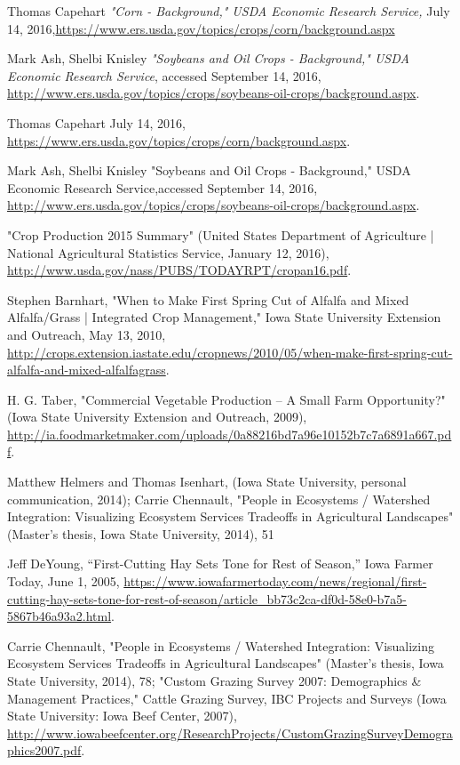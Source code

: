 \documentclass[11pt]{article}
\begin{document}
\begin{thebibliography}{1}

   Thomas Capehart {\em "Corn - Background," USDA Economic Research Service, }July 14, 2016,\url{https://www.ers.usda.gov/topics/crops/corn/background.aspx}

    Mark Ash, Shelbi Knisley {\em "Soybeans and Oil Crops - Background," USDA Economic Research Service}, accessed September 14, 2016, \url{http://www.ers.usda.gov/topics/crops/soybeans-oil-crops/background.aspx}.

   Thomas Capehart July 14, 2016, \url{https://www.ers.usda.gov/topics/crops/corn/background.aspx}.

  Mark Ash, Shelbi Knisley  "Soybeans and Oil Crops - Background," USDA Economic Research Service,accessed September 14, 2016, \url{http://www.ers.usda.gov/topics/crops/soybeans-oil-crops/background.aspx}.

  "Crop Production 2015 Summary" (United States Department of Agriculture | National Agricultural Statistics Service, January 12, 2016), \url{http://www.usda.gov/nass/PUBS/TODAYRPT/cropan16.pdf}.

  Stephen Barnhart, "When to Make First Spring Cut of Alfalfa and Mixed Alfalfa/Grass | Integrated Crop Management," Iowa State University Extension and Outreach, May 13, 2010, \url{http://crops.extension.iastate.edu/cropnews/2010/05/when-make-first-spring-cut-alfalfa-and-mixed-alfalfagrass}.

  H. G. Taber, "Commercial Vegetable Production – A Small Farm Opportunity?" (Iowa State University Extension and Outreach, 2009), \url{http://ia.foodmarketmaker.com/uploads/0a88216bd7a96e10152b7c7a6891a667.pdf}.

  Matthew Helmers and Thomas Isenhart, (Iowa State University, personal communication, 2014); Carrie Chennault, "People in Ecosystems / Watershed Integration: Visualizing Ecosystem Services Tradeoffs in Agricultural Landscapes" (Master’s thesis, Iowa State University, 2014), 51

  Jeff DeYoung, “First-Cutting Hay Sets Tone for Rest of Season,” Iowa Farmer Today, June 1, 2005, \url{https://www.iowafarmertoday.com/news/regional/first-cutting-hay-sets-tone-for-rest-of-season/article_bb73c2ca-df0d-58e0-b7a5-5867b46a93a2.html}.

Carrie Chennault, "People in Ecosystems / Watershed Integration: Visualizing Ecosystem Services Tradeoffs in Agricultural Landscapes" (Master’s thesis, Iowa State University, 2014), 78; "Custom Grazing Survey 2007: Demographics \& Management Practices," Cattle Grazing Survey, IBC Projects and Surveys (Iowa State University: Iowa Beef Center, 2007), \url{http://www.iowabeefcenter.org/ResearchProjects/CustomGrazingSurveyDemographics2007.pdf}.


\end{thebibliography}
\end{document}

